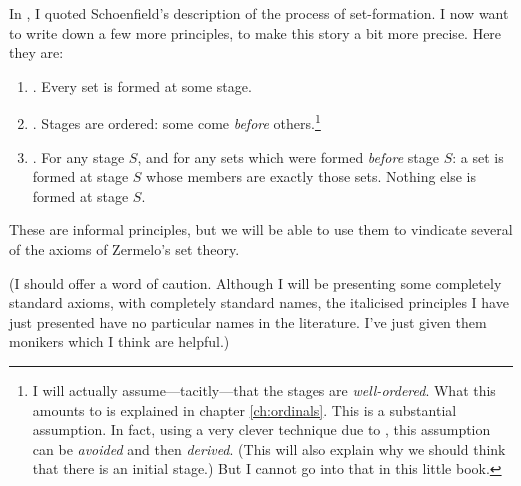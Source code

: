 \documentclass[../../../include/open-logic-section]{subfiles}
\begin{document}
	
In , I quoted Schoenfield's description of the process of set-formation. I now want to write down a few more principles, to make this story a bit more precise. Here they are:
\begin{enumerate}
	\item[] \stageshier. Every set is formed at some stage.
	\item[] \stagesord. Stages are ordered: some come \emph{before} others.\footnote{I will actually assume---tacitly---that the stages are \emph{well-ordered}. What this amounts to is explained in chapter \ref{ch:ordinals}. This is a substantial assumption. In fact, using a very clever technique due to \citet{Scott1974}, this assumption can be \emph{avoided} and then \emph{derived}. (This will also explain why we should think that there is an initial stage.) But I cannot go into that in this little book.}
	\item[] \stagesacc. For any stage $S$, and for any sets which were formed \emph{before} stage $S$: a set is formed at stage $S$ whose members are exactly those sets. Nothing else is formed at stage $S$.
\end{enumerate}
These are informal principles, but we will be able to use them to  vindicate several of the axioms of Zermelo's set theory. 

(I should offer a word of caution. Although I will be presenting some completely standard axioms, with completely standard names, the italicised principles I have just presented have no particular names in the literature. I've just given them monikers which I think are helpful.)
\end{document}
